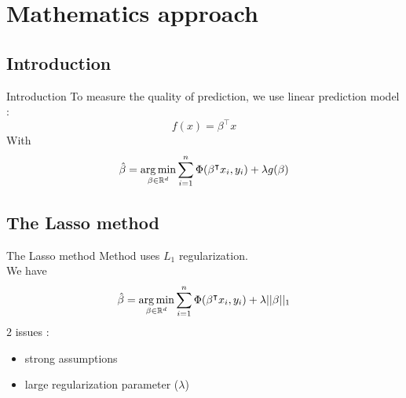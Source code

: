 \documentclass[unknownkeysallowed]{beamer}
\newcommand{\trans}[1]{{#1}^\intercal} %
\begin{document}




\section{Mathematics approach}
\label{sec:Mathematics approach}

\subsection*{Introduction}
\label{sub:Intro}
\begin{frame}{Introduction}
To measure the quality of prediction, we use linear prediction model :
\[f(x)=\trans{\beta}x\]
With \[\hat{\beta}=\underset{\beta \in \bbR^d}\argmin\sum_{i=1}^n \Phi(\trans{\beta}x_i, y_i)+\lambda g(\beta)\]  
\end{frame}



\subsection{The Lasso method}
\label{sub:Lasso}

\begin{frame}{The Lasso method}
\vspace{0.4cm}
Method uses $L_1$ regularization.\\
We have \[\hat{\beta}=\underset{\beta \in \bbR^d}\argmin\sum_{i=1}^n \Phi(\trans{\beta}x_i, y_i)+\lambda ||\beta||_1\]
$2$ issues :
\begin{itemize}
    \item strong assumptions
    \item large regularization parameter ($\lambda$)
\end{itemize}
\end{frame}
\end{document}
